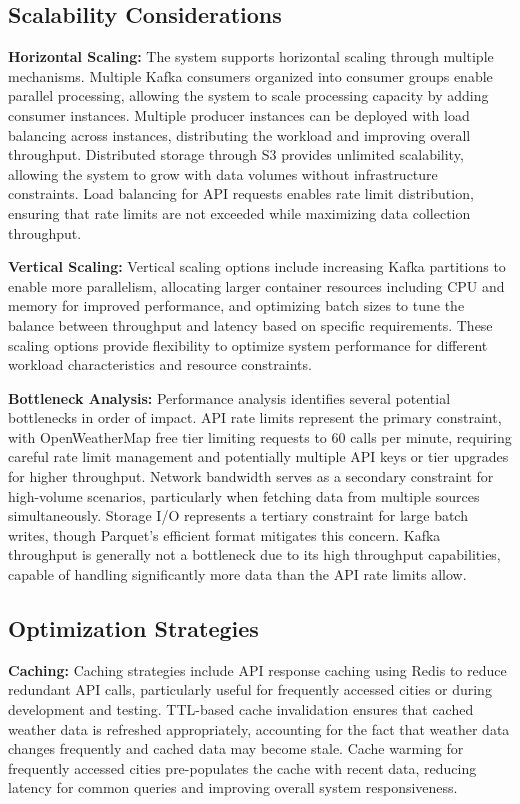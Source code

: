 \documentclass[12pt,a4paper]{article}
\begin{document}
\subsection{Scalability Considerations}

\textbf{Horizontal Scaling:} The system supports horizontal scaling through multiple mechanisms. Multiple Kafka consumers organized into consumer groups enable parallel processing, allowing the system to scale processing capacity by adding consumer instances. Multiple producer instances can be deployed with load balancing across instances, distributing the workload and improving overall throughput. Distributed storage through S3 provides unlimited scalability, allowing the system to grow with data volumes without infrastructure constraints. Load balancing for API requests enables rate limit distribution, ensuring that rate limits are not exceeded while maximizing data collection throughput.

\textbf{Vertical Scaling:} Vertical scaling options include increasing Kafka partitions to enable more parallelism, allocating larger container resources including CPU and memory for improved performance, and optimizing batch sizes to tune the balance between throughput and latency based on specific requirements. These scaling options provide flexibility to optimize system performance for different workload characteristics and resource constraints.

\textbf{Bottleneck Analysis:} Performance analysis identifies several potential bottlenecks in order of impact. API rate limits represent the primary constraint, with OpenWeatherMap free tier limiting requests to 60 calls per minute, requiring careful rate limit management and potentially multiple API keys or tier upgrades for higher throughput. Network bandwidth serves as a secondary constraint for high-volume scenarios, particularly when fetching data from multiple sources simultaneously. Storage I/O represents a tertiary constraint for large batch writes, though Parquet's efficient format mitigates this concern. Kafka throughput is generally not a bottleneck due to its high throughput capabilities, capable of handling significantly more data than the API rate limits allow.

\subsection{Optimization Strategies}

\textbf{Caching:} Caching strategies include API response caching using Redis to reduce redundant API calls, particularly useful for frequently accessed cities or during development and testing. TTL-based cache invalidation ensures that cached weather data is refreshed appropriately, accounting for the fact that weather data changes frequently and cached data may become stale. Cache warming for frequently accessed cities pre-populates the cache with recent data, reducing latency for common queries and improving overall system responsiveness.
\end{document}
